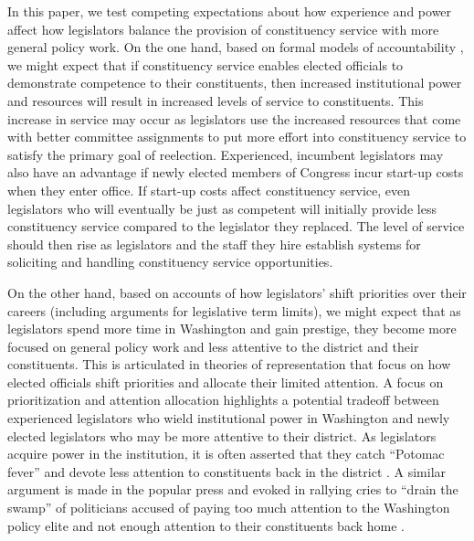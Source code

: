 \documentclass[12pt]{article}
\begin{document}
In this paper, we test competing expectations about how experience and power affect how legislators balance the provision of constituency service with more general policy work. On the one hand, based on formal models of accountability \citep{AshworthBuenodeMesquita2006}, we might expect that if constituency service enables elected officials to demonstrate competence to their constituents, then increased institutional power and resources will result in increased levels of service to constituents. This increase in service may occur as legislators use the increased resources that come with better committee assignments to put more effort into constituency service to satisfy the primary goal of reelection. Experienced, incumbent legislators may also have an advantage if newly elected members of Congress incur start-up costs when they enter office. If start-up costs affect constituency service, even legislators who will eventually be just as competent will initially provide less constituency service compared to the legislator they replaced. The level of service should then rise as legislators and the staff they hire establish systems for soliciting and handling constituency service opportunities.


On the other hand, based on accounts of how legislators' shift priorities over their careers (including arguments for legislative term limits), we might expect that as legislators spend more time in Washington and gain prestige, they become more focused on general policy work and less attentive to the district and their constituents. This is articulated in theories of representation that focus on how elected officials shift priorities and allocate their limited attention. A focus on prioritization and attention allocation highlights a potential tradeoff between experienced legislators who wield institutional power in Washington and newly elected legislators who may be more attentive to their district. As legislators acquire power in the institution, it is often asserted that they catch ``Potomac fever'' and devote less attention to constituents back in the district \citep{Fenno1978}. A similar argument is made in the popular press \citep{Edwards2005} and evoked in rallying cries to ``drain the swamp'' of politicians accused of paying too much attention to the Washington policy elite and not enough attention to their constituents back home \citep{Rosenblatt2016}. 
\end{document}
